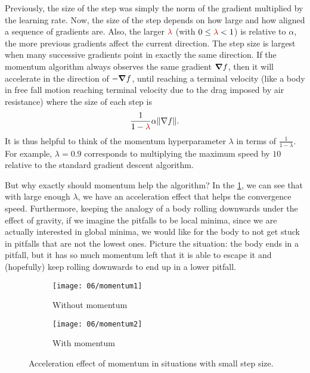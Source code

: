 Previously, the size of the step was simply the norm of the gradient multiplied by the learning rate. Now, the size of the step depends on how large and how aligned a sequence of gradients are. Also, the larger ${\color{red}\lambda}$ (with $0 \leq {\color{red}\lambda} < 1$) is relative to $\alpha$, the more previous gradients affect the current direction. The step size is largest when many successive gradients point in exactly the same direction. If the momentum algorithm always observes the same gradient $\gradient f$, then it will accelerate in the direction of $- \gradient f$, until reaching a terminal velocity (like a body in free fall motion reaching terminal velocity due to the drag imposed by air resistance) where the size of each step is
\begin{equation}
    \frac{1}{1-{\color{red}\lambda}}  \alpha \norm{\nabla f}.
\end{equation}
It is thus helpful to think of the momentum hyperparameter $\lambda$ in terms of $\frac{1}{1 - \lambda}$. For example, $\lambda = 0.9$ corresponds to multiplying the maximum speed by $10$ relative to the standard gradient descent algorithm.

But why exactly should momentum help the algorithm? In the \cref{fig:chap6:momentum}, we can see that with large enough $\lambda$, we have an acceleration effect that helps the convergence speed. Furthermore, keeping the analogy of a body rolling downwards under the effect of gravity, if we imagine the pitfalls to be local minima, since we are actually interested in global minima, we would like for the body to not get stuck in pitfalls that are not the lowest ones. Picture the situation: the body ends in a pitfall, but it has so much momentum left that it is able to escape it and (hopefully) keep rolling downwards to end up in a lower pitfall.

\begin{figure}[H]
    \centering
    \begin{subfigure}[t]{\linewidth}
        \centering
        \texttt{[image: 06/momentum1]}
        \caption{Without momentum}       
    \end{subfigure}
    \vfill
    \begin{subfigure}[b]{\linewidth}
        \centering
        \texttt{[image: 06/momentum2]}
        \caption{With momentum}
    \end{subfigure}
    \caption{Acceleration effect of momentum in situations with small step size.}
    \label{fig:chap6:momentum}
\end{figure}

